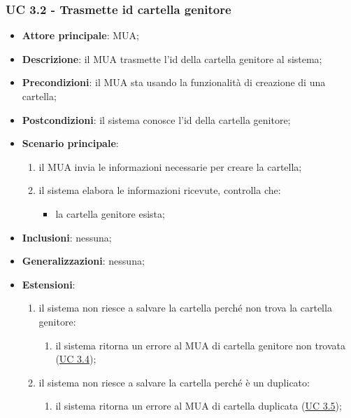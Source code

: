     \subsubsection{UC 3.2 - Trasmette id cartella genitore} \label{sec:UC3.2}
    \begin{itemize}
        \item \textbf{Attore principale}: MUA;
        \item \textbf{Descrizione}: il MUA trasmette l'id della cartella genitore al sistema;
        \item \textbf{Precondizioni}: il MUA sta usando la funzionalità di creazione di una cartella;
        \item \textbf{Postcondizioni}: il sistema conosce l'id della cartella genitore;
        \item \textbf{Scenario principale}:
            \begin{enumerate}
                \item il MUA invia le informazioni necessarie per creare la cartella;
                \item il sistema elabora le informazioni ricevute, controlla che:
                \begin{itemize}
                    \item la cartella genitore esista;
                \end{itemize}
            \end{enumerate}
        \item \textbf{Inclusioni}: nessuna;
        \item \textbf{Generalizzazioni}: nessuna;
        \item \textbf{Estensioni}:
            \begin{enumerate}[label=\alph*.]
                \item il sistema non riesce a salvare la cartella perché non trova la cartella genitore:
                \begin{enumerate}[label=\arabic*.]
                    \item il sistema ritorna un errore al MUA di cartella genitore non trovata (\hyperref[sec:UC3.4]{UC 3.4});
                    \end{enumerate}
                \item il sistema non riesce a salvare la cartella perché è un duplicato:
                \begin{enumerate}[label=\arabic*.]
                    \item il sistema ritorna un errore al MUA di cartella duplicata (\hyperref[sec:UC3.5]{UC 3.5});
                \end{enumerate}
                
            \end{enumerate}
    \end{itemize}



